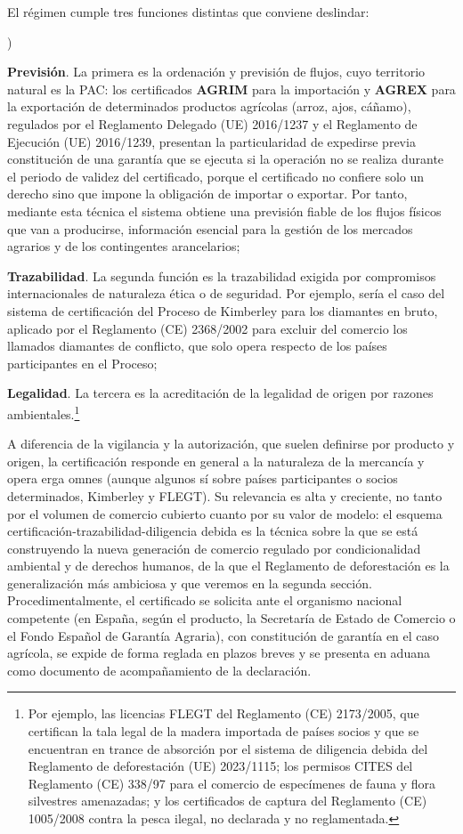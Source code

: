 \documentclass[10pt,a4paper]{article}
\newcounter{alphaitem}
\newenvironment{la}
      {\begin{list}{\alph{alphaitem})}{%
          \usecounter{alphaitem}%
          \setlength{\leftmargin}{1cm}%
          \setlength{\parskip}{3pt}%
          \setlength{\itemsep}{0pt}%
          \setlength{\parsep}{0pt}%
      }}
      {\end{list}}
\begin{document}
El régimen cumple tres funciones distintas que conviene deslindar:
\begin{la}
    \item \textbf{Previsión}. La primera es la ordenación y previsión de flujos, cuyo territorio natural es la PAC: los certificados \textbf{AGRIM} para la importación y \textbf{AGREX} para la exportación de determinados productos agrícolas (arroz, ajos, cáñamo), regulados por el Reglamento Delegado (UE) 2016/1237 y el Reglamento de Ejecución (UE) 2016/1239, presentan la particularidad de expedirse previa constitución de una garantía que se ejecuta si la operación no se realiza durante el periodo de validez del certificado, porque el certificado no confiere solo un derecho sino que impone la obligación de importar o exportar. Por tanto, mediante esta técnica el sistema obtiene una previsión fiable de los flujos físicos que van a producirse, información esencial para la gestión de los mercados agrarios y de los contingentes arancelarios;
    \item \textbf{Trazabilidad}. La segunda función es la trazabilidad exigida por compromisos internacionales de naturaleza ética o de seguridad. Por ejemplo, sería el caso del sistema de certificación del Proceso de Kimberley para los diamantes en bruto, aplicado por el Reglamento (CE) 2368/2002 para excluir del comercio los llamados diamantes de conflicto, que solo opera respecto de los países participantes en el Proceso;
    \item \textbf{Legalidad}. La tercera es la acreditación de la legalidad de origen por razones ambientales.\footnote{%
        Por ejemplo, las licencias FLEGT del Reglamento (CE) 2173/2005, que certifican la tala legal de la madera importada de países socios y que se encuentran en trance de absorción por el sistema de diligencia debida del Reglamento de deforestación (UE) 2023/1115; los permisos CITES del Reglamento (CE) 338/97 para el comercio de especímenes de fauna y flora silvestres amenazadas; y los certificados de captura del Reglamento (CE) 1005/2008 contra la pesca ilegal, no declarada y no reglamentada.
    }
\end{la}

A diferencia de la vigilancia y la autorización, que suelen definirse por producto y origen, la certificación responde en general a la naturaleza de la mercancía y opera erga omnes (aunque algunos sí sobre países participantes o socios determinados, Kimberley y FLEGT). Su relevancia es alta y creciente, no tanto por el volumen de comercio cubierto cuanto por su valor de modelo: el esquema certificación-trazabilidad-diligencia debida es la técnica sobre la que se está construyendo la nueva generación de comercio regulado por condicionalidad ambiental y de derechos humanos, de la que el Reglamento de deforestación es la generalización más ambiciosa y que veremos en la segunda sección. Procedimentalmente, el certificado se solicita ante el organismo nacional competente (en España, según el producto, la Secretaría de Estado de Comercio o el Fondo Español de Garantía Agraria), con constitución de garantía en el caso agrícola, se expide de forma reglada en plazos breves y se presenta en aduana como documento de acompañamiento de la declaración.
\end{document}
